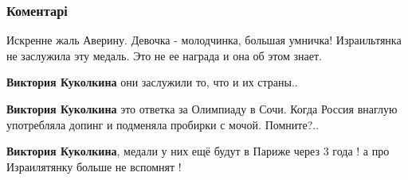  
 
 
 
 
\subsubsection{Коментарі}

\begin{itemize}


Искренне жаль Аверину. Девочка - молодчинка, большая умничка! Израильтянка не
заслужила эту медаль. Это не ее награда и она об этом знает.

\begin{itemize}
 
\textbf{Виктория Куколкина} они заслужили то, что и их страны..

 
\textbf{Виктория Куколкина} это ответка за Олимпиаду в Сочи. Когда Россия внаглую употребляла допинг и подменяла пробирки с мочой. Помните?..

 
\textbf{Виктория Куколкина}, медали у них ещё будут в Париже через 3 года ! а про Израилятянку больше не вспомнят !

 

\end{itemize}
\end{itemize}

